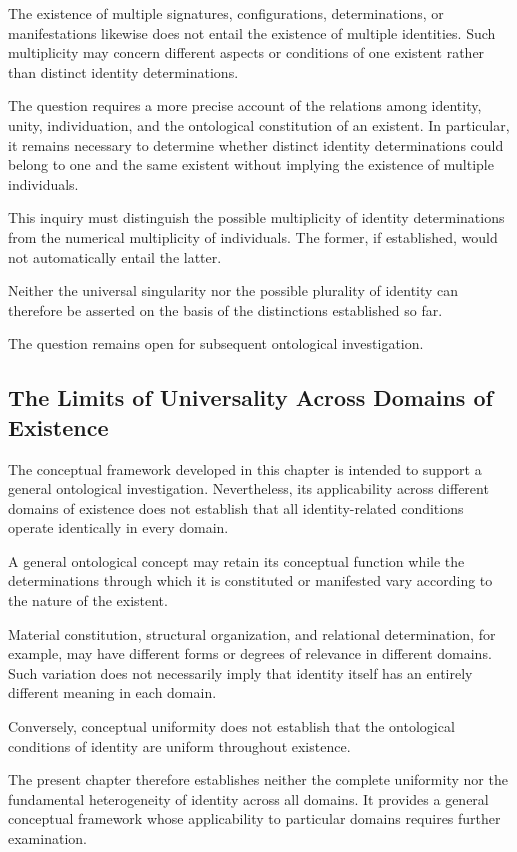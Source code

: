 The existence of multiple signatures, configurations,
determinations, or manifestations likewise does not entail
the existence of multiple identities. Such multiplicity
may concern different aspects or conditions of one
existent rather than distinct identity determinations.

The question requires a more precise account of the
relations among identity, unity, individuation, and the
ontological constitution of an existent. In particular,
it remains necessary to determine whether distinct
identity determinations could belong to one and the same
existent without implying the existence of multiple
individuals.

This inquiry must distinguish the possible multiplicity
of identity determinations from the numerical multiplicity
of individuals. The former, if established, would not
automatically entail the latter.

Neither the universal singularity nor the possible
plurality of identity can therefore be asserted on the
basis of the distinctions established so far.

The question remains open for subsequent ontological
investigation.

\subsection{The Limits of Universality Across Domains of Existence}

The conceptual framework developed in this chapter is
intended to support a general ontological investigation.
Nevertheless, its applicability across different domains
of existence does not establish that all identity-related
conditions operate identically in every domain.

A general ontological concept may retain its conceptual
function while the determinations through which it is
constituted or manifested vary according to the nature
of the existent.

Material constitution, structural organization, and
relational determination, for example, may have different
forms or degrees of relevance in different domains.
Such variation does not necessarily imply that identity
itself has an entirely different meaning in each domain.

Conversely, conceptual uniformity does not establish
that the ontological conditions of identity are uniform
throughout existence.

The present chapter therefore establishes neither the
complete uniformity nor the fundamental heterogeneity
of identity across all domains. It provides a general
conceptual framework whose applicability to particular
domains requires further examination.

